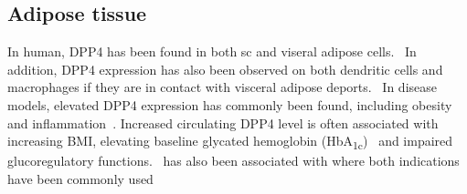 \subsection{Adipose tissue}
In human, DPP4 has been found in both sc and viseral adipose cells.~\cite{Lamers2011} In addition, DPP4 expression has also been observed on both dendritic cells and macrophages if they are in contact with visceral adipose deports.~\cite{Zhong2013} In disease models, elevated DPP4 expression has commonly been found, including obesity and inflammation~\cite{Zhong2013}. Increased circulating DPP4 level is often associated with increasing BMI, elevating baseline glycated hemoglobin (HbA\textsubscript{1c})~\cite{2011}  and impaired glucoregulatory functions.~  has also been associated with where both indications have been commonly used 